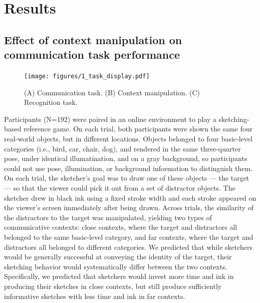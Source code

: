 \documentclass[9pt,twocolumn,twoside]{pnas-new}
\begin{document}
\section*{Results}

\subsection*{Effect of context manipulation on communication task performance}



\begin{figure}[htbp]
\centering
\texttt{[image: figures/1\_task\_display.pdf]}
\caption{(A) Communication task. (B) Context manipulation. (C) Recognition task.}
\label{task_display}
\end{figure}

Participants (N=192) were paired in an online environment to play a sketching-based reference game. On each trial, both participants were shown the same four real-world objects, but in different locations. Objects belonged to four basic-level categories (i.e., bird, car, chair, dog), and rendered in the same three-quarter pose, under identical illumatination, and on a gray background, so participants could not use pose, illumination, or background information to distinguish them. On each trial, the sketcher's goal was to draw one of these objects --- the target --- so that the viewer could pick it out from a set of distractor objects. The sketcher drew in black ink using a fixed stroke width and each stroke appeared on the viewer's screen immediately after being drawn. Across trials, the similarity of the distractors to the target was manipulated, yielding two types of communicative contexts: close contexts, where the target and distractors all belonged to the same basic-level category, and far contexts, where the target and distractors all belonged to different categories. We predicted that while sketchers would be generally successful at conveying the identity of the target, their sketching behavior would systematically differ between the two contexts. Specifically, we predicted that sketchers would invest more time and ink in producing their sketches in close contexts, but still produce sufficiently informative sketches with less time and ink in far contexts. 
\end{document}

